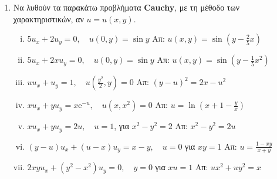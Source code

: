\documentclass[a4paper,table]{report}
\begin{document}
\begin{enumerate}
  \item Να λυθούν τα παρακάτω προβλήματα \textlatin{\textbf{Cauchy}}, με τη μέθοδο των
    χαρακτηριστικών,  αν $u=u(x,y)$.

    \begin{enumerate}[i)]
      \item $5u_{x}+2u_{y}=0, \quad u(0,y)=\sin y$ 
        \hfill Απ: $u(x,y)=\sin(y-\frac{2}{5}x)$
      \item $5u_{x}+2xu_{y}=0, \quad u(0,y)=\sin y$ 
        \hfill Απ: $u(x,y)=\sin(y-\frac{1}{5}x^{2})$ 
      \item $uu_{x}+u_{y}=1, \quad u(\frac{y^{2}}{2},y)=0$ 
        \hfill Απ: $(y-u)^{2}=2x-u^{2}$
      \item $ xu_{x}+yu_{y}=x \mathrm{e}^{-u}, \quad  u(x,x^{2})=0 $
        \hfill Απ: $ u= \ln{(x+1 - \frac{y}{x})} $ 
      \item $xu_{x}+yu_{y}=2u,\quad u=1$, για $x^{2}-y^{2}=2$ 
        \hfill Απ: $x^{2}-y^{2}=2u$
      \item $ (y-u)u_{x}+(u-x)u_{y}=x-y , \quad  u=0 $ για $ xy=1 $
        \hfill Απ: $ u= \frac{1-xy}{x+y} $  
      \item $2xyu_{x}+(y^{2}-x^{2})u_{y}=0, \quad y=0$ για $xu=1$ 
        \hfill Απ: $ux^{2}+uy^{2}=x$
    \end{enumerate}
\end{enumerate}
\end{document}
